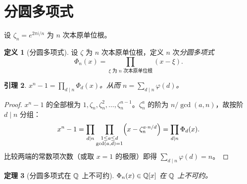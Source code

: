 \documentclass{article}
\theoremstyle{plain}
\newtheorem{thm}{定理}[section]
\newtheorem{lem}[thm]{引理}
\theoremstyle{definition}
\newtheorem{defn}[thm]{定义}
\theoremstyle{remark}
\begin{document}
\section{分圆多项式}

设 $\zeta_n=e^{2\pi i/n}$ 为 $n$ 次本原单位根。

\begin{defn}[分圆多项式]
  设 $\zeta$ 为 $n$ 次本原单位根，定义 $n$ 次\emph{分圆多项式}
  \[
    \Phi_n(x)=\prod_{\xi\text{ 为 $n$ 次本原单位根}}(x-\xi).
  \]
\end{defn}

\begin{lem}\label{lem:cyclo-factor}
  $x^n-1=\displaystyle\prod_{d\mid n}\Phi_d(x)$。从而 $n=\displaystyle\sum_{d\mid n}\varphi(d)$。
\end{lem}

\begin{proof}
  $x^n-1$ 的全部根为 $1,\zeta_n,\zeta_n^2,\dots,\zeta_n^{n-1}$。$\zeta_n^a$ 的阶为 $n/\gcd(a,n)$，故按阶 $d\mid n$ 分组：
  \[
    x^n-1=\prod_{d\mid n}\prod_{\substack{1\le a\le d\\\gcd(a,d)=1}}\Bigl(x-\zeta_n^{a\cdot n/d}\Bigr)=\prod_{d\mid n}\Phi_d(x).
  \]
  比较两端的常数项次数（或取 $x=1$ 的极限）即得 $\sum_{d\mid n}\varphi(d)=n$。
\end{proof}

\begin{thm}[分圆多项式在 $\mathbb{Q}$ 上不可约]\label{thm:cyclo-irred}
  $\Phi_n(x)\in\mathbb{Q}[x]$ 在 $\mathbb{Q}$ 上不可约。
\end{thm}
\end{document}
